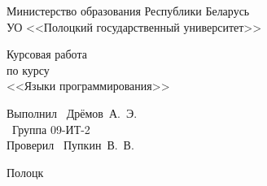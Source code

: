 \begin{titlepage}

  \newpage

  \begin{center}
    Министерство образования Республики Беларусь \\
    \vspace{0.5cm}
    УО <<Полоцкий государственный университет>> \\
  \end{center}

  \vspace{6em}


  \vspace{9em}

  \begin{center}
    \Large Курсовая работа \\ по курсу \\ <<Языки программирования>>
  \end{center}

  \vspace{6em}

  \begin{flushleft}
    Выполнил \hfill\ Дрёмов~А.~Э. \\
    \hfill\ Группа 09-ИТ-2 \\
    \vspace{1.5em}
    Проверил \hfill\ Пупкин~В.~В. \\
  \end{flushleft}

  \vspace{\fill}

  \begin{center}
    Полоцк \\ \the\year
  \end{center}

\end{titlepage}
